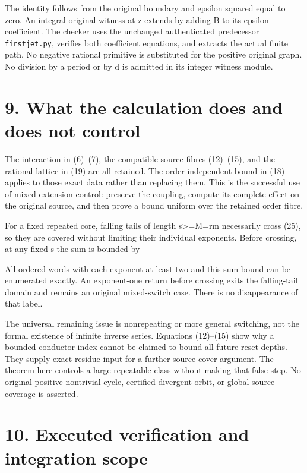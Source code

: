 The identity follows from the original boundary and epsilon squared
equal to zero. An integral original witness at z extends by adding B to
its epsilon coefficient. The checker uses the unchanged authenticated
predecessor \nolinkurl{firstjet.py}, verifies both coefficient
equations, and extracts the actual finite path. No negative rational
primitive is substituted for the positive original graph. No division by
a period or by d is admitted in its integer witness module.

\section{9. What the calculation does and does not control}

The interaction in (6)--(7), the compatible source fibres (12)--(15),
and the rational lattice in (19) are all retained. The order-independent
bound in (18) applies to those exact data rather than replacing them.
This is the successful use of mixed extension control: preserve the
coupling, compute its complete effect on the original source, and then
prove a bound uniform over the retained order fibre.

For a fixed repeated core, falling tails of length s\textgreater=M=rm
necessarily cross (25), so they are covered without limiting their
individual exponents. Before crossing, at any fixed s the sum is bounded
by


All ordered words with each exponent at least two and this sum bound can
be enumerated exactly. An exponent-one return before crossing exits the
falling-tail domain and remains an original mixed-switch case. There is
no disappearance of that label.

The universal remaining issue is nonrepeating or more general switching,
not the formal existence of infinite inverse series. Equations
(12)--(15) show why a bounded conductor index cannot be claimed to bound
all future reset depths. They supply exact residue input for a further
source-cover argument. The theorem here controls a large repeatable
class without making that false step. No original positive nontrivial
cycle, certified divergent orbit, or global source coverage is asserted.

\section{10. Executed verification and integration scope}

